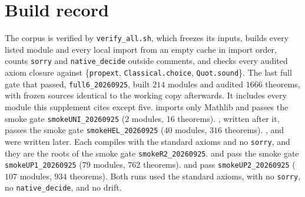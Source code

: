\section*{Build record}
The corpus is verified by \texttt{verify\_all.sh}, which freezes its inputs, builds every listed
module and every local import from an empty cache in import order, counts \texttt{sorry} and
\texttt{native\_decide} outside comments, and checks every audited axiom closure against
\{\texttt{propext}, \texttt{Classical.choice}, \texttt{Quot.sound}\}. The last full gate that
passed, \texttt{full6\_20260925}, built $214$ modules and audited $1666$ theorems, with frozen
sources identical to the working copy afterwards. It includes every module this supplement
cites except five.  imports only Mathlib and passes the smoke
gate \texttt{smokeUNI\_20260925} ($2$ modules, $16$ theorems). ,
written after it, passes the smoke gate \texttt{smokeHEL\_20260925} ($40$ modules, $316$ theorems).
,  and
 were written later. Each compiles with the standard axioms and no
\texttt{sorry}, and they are the roots of the smoke gate \texttt{smokeR2\_20260925}.
 and  pass the smoke gate
\texttt{smokeUP1\_20260925} ($79$ modules, $762$ theorems).  and
 pass \texttt{smokeUP2\_20260925} ($107$ modules, $934$ theorems).
Both runs used the standard axioms, with no \texttt{sorry}, no \texttt{native\_decide}, and no
drift.


